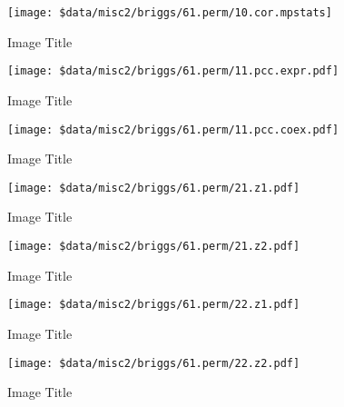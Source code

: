 \documentclass[11pt,]{article}
\begin{document}
\begin{figure}
\centering
\texttt{[image: \$data/misc2/briggs/61.perm/10.cor.mpstats]}
\caption{Image Title}
\end{figure}

\begin{figure}
\centering
\texttt{[image: \$data/misc2/briggs/61.perm/11.pcc.expr.pdf]}
\caption{Image Title}
\end{figure}

\begin{figure}
\centering
\texttt{[image: \$data/misc2/briggs/61.perm/11.pcc.coex.pdf]}
\caption{Image Title}
\end{figure}

\begin{figure}
\centering
\texttt{[image: \$data/misc2/briggs/61.perm/21.z1.pdf]}
\caption{Image Title}
\end{figure}

\begin{figure}
\centering
\texttt{[image: \$data/misc2/briggs/61.perm/21.z2.pdf]}
\caption{Image Title}
\end{figure}

\begin{figure}
\centering
\texttt{[image: \$data/misc2/briggs/61.perm/22.z1.pdf]}
\caption{Image Title}
\end{figure}

\begin{figure}
\centering
\texttt{[image: \$data/misc2/briggs/61.perm/22.z2.pdf]}
\caption{Image Title}
\end{figure}
\newpage
\singlespacing 
\end{document}
